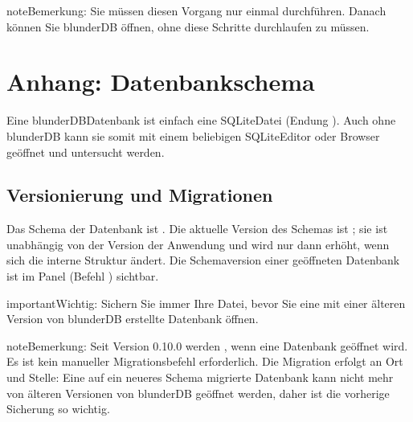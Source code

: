\documentclass[letterpaper,10pt,german]{sphinxmanual}
\begin{document}
\begin{sphinxadmonition}{note}{Bemerkung:}
\sphinxAtStartPar
Sie müssen diesen Vorgang nur einmal durchführen. Danach können Sie blunderDB öffnen, ohne diese Schritte durchlaufen zu müssen.
\end{sphinxadmonition}

\sphinxstepscope


\section{Anhang: Datenbankschema}
\label{\detokenize{annexe_db_scheme:annexe-schema-de-la-base-de-donnees}}\label{\detokenize{annexe_db_scheme:annexe-db-migration}}\label{\detokenize{annexe_db_scheme::doc}}
\sphinxAtStartPar
Eine blunderDB\sphinxhyphen{}Datenbank ist einfach eine SQLite\sphinxhyphen{}Datei (Endung ). Auch ohne blunderDB kann sie somit mit einem beliebigen SQLite\sphinxhyphen{}Editor oder \sphinxhyphen{}Browser geöffnet und untersucht werden.


\subsection{Versionierung und Migrationen}
\label{\detokenize{annexe_db_scheme:versionnage-et-migrations}}
\sphinxAtStartPar
Das Schema der Datenbank ist . Die aktuelle Version des Schemas ist ; sie ist unabhängig von der Version der Anwendung und wird nur dann erhöht, wenn sich die interne Struktur ändert. Die Schemaversion einer geöffneten Datenbank ist im Panel  (Befehl ) sichtbar.

\begin{sphinxadmonition}{important}{Wichtig:}
\sphinxAtStartPar
Sichern Sie immer Ihre \sphinxhyphen{}Datei, bevor Sie eine mit einer älteren Version von blunderDB erstellte Datenbank öffnen.
\end{sphinxadmonition}

\begin{sphinxadmonition}{note}{Bemerkung:}
\sphinxAtStartPar
Seit Version 0.10.0 werden , wenn eine Datenbank geöffnet wird. Es ist kein manueller Migrationsbefehl erforderlich. Die Migration erfolgt an Ort und Stelle: Eine auf ein neueres Schema migrierte Datenbank kann nicht mehr von älteren Versionen von blunderDB geöffnet werden, daher ist die vorherige Sicherung so wichtig.
\end{sphinxadmonition}
\end{document}
